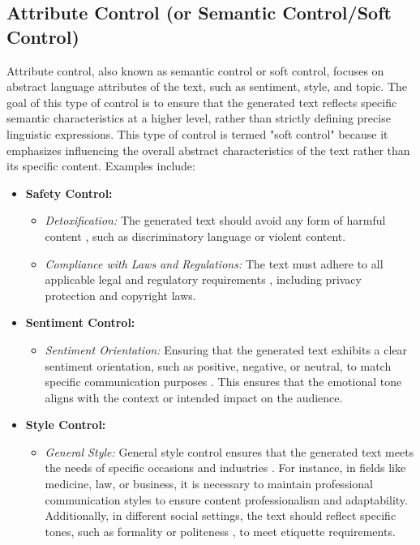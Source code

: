 \documentclass[acmsmall, screen]{acmart}
\begin{document}
\subsection{Attribute Control (or Semantic Control/Soft Control)}
Attribute control, also known as semantic control or soft control, focuses on abstract language attributes of the text, such as sentiment, style, and topic. The goal of this type of control is to ensure that the generated text reflects specific semantic characteristics at a higher level, rather than strictly defining precise linguistic expressions. This type of control is termed "soft control" because it emphasizes influencing the overall abstract characteristics of the text rather than its specific content. Examples include:

\begin{itemize}
    \item \textbf{Safety Control:}
    \begin{itemize}
        \item \textit{Detoxification:} The generated text should avoid any form of harmful content \cite{liu_acl21_DExperts,schick_tacl21_SD,dai_iclr24_SafeRLHF}, such as discriminatory language or violent content.
        \item \textit{Compliance with Laws and Regulations:} The text must adhere to all applicable legal and regulatory requirements \cite{bai_arxiv22_constitutionalai}, including privacy protection and copyright laws.
    \end{itemize}
    
    \item \textbf{Sentiment Control:}
    \begin{itemize}
        \item \textit{Sentiment Orientation:} Ensuring that the generated text exhibits a clear sentiment orientation, such as positive, negative, or neutral, to match specific communication purposes \cite{dathathri_iclr20_PPLM,zeldes_arxiv20_AuxiliaryTuning,chan_iclr21_CoCon,krause_emnlp21_gedi}. This ensures that the emotional tone aligns with the context or intended impact on the audience.
    \end{itemize}
    
    \item \textbf{Style Control:}
    \begin{itemize}
        \item \textit{General Style:} General style control ensures that the generated text meets the needs of specific occasions and industries \cite{keskar_arxiv19_Ctrl}. For instance, in fields like medicine, law, or business, it is necessary to maintain professional communication styles to ensure content professionalism and adaptability. Additionally, in different social settings, the text should reflect specific tones, such as formality or politeness \cite{saha_ijcai22_CounterGeDi,trotta_gem22_kNN-SCG}, to meet etiquette requirements.
        

\end{itemize}
\end{itemize}
\end{document}
